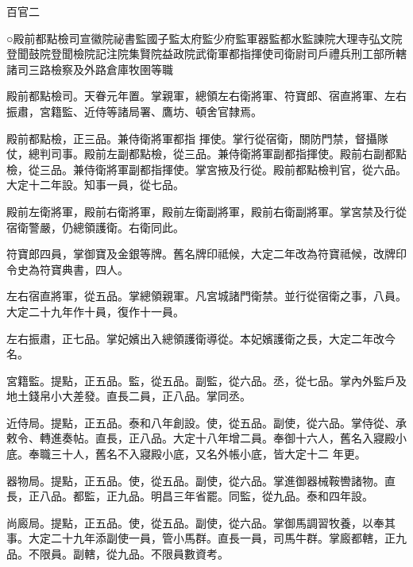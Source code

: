 
\begin{pinyinscope}

 百官二



 ○殿前都點檢司宣徽院祕書監國子監太府監少府監軍器監都水監諫院大理寺弘文院登聞鼓院登聞檢院記注院集賢院益政院武衛軍都指揮使司衛尉司戶禮兵刑工部所轄諸司三路檢察及外路倉庫牧圉等職



 殿前都點檢司。天眷元年置。掌親軍，總領左右衛將軍、符寶郎、宿直將軍、左右振肅，宮籍監、近侍等諸局署、鷹坊、頓舍官隸焉。



 殿前都點檢，正三品。兼侍衛將軍都指
 揮使。掌行從宿衛，關防門禁，督攝隊仗，總判司事。殿前左副都點檢，從三品。兼侍衛將軍副都指揮使。殿前右副都點檢，從三品。兼侍衛將軍副都指揮使。掌宮掖及行從。殿前都點檢判官，從六品。大定十二年設。知事一員，從七品。



 殿前左衛將軍，殿前右衛將軍，殿前左衛副將軍，殿前右衛副將軍。掌宮禁及行從宿衛警嚴，仍總領護衛。右衛同此。



 符寶郎四員，掌御寶及金銀等牌。舊名牌印祗候，大定二年改為符寶祗候，改牌印令史為符寶典書，四人。



 左右宿直將軍，從五品。掌總領親軍。凡宮城諸門衛禁。並行從宿衛之事，八員。大定二十九年作十員，復作十一員。



 左右振肅，正七品。掌妃嬪出入總領護衛導從。本妃嬪護衛之長，大定二年改今名。



 宮籍監。提點，正五品。監，從五品。副監，從六品。丞，從七品。掌內外監戶及地土錢帛小大差發。直長二員，正八品。掌同丞。



 近侍局。提點，正五品。泰和八年創設。使，從五品。副使，從六品。掌侍從、承敕令、轉進奏帖。直長，正八品。大定十八年增二員。奉御十六人，舊名入寢殿小底。奉職三十人，舊名不入寢殿小底，又名外帳小底，皆大定十二
 年更。



 器物局。提點，正五品。使，從五品。副使，從六品。掌進御器械鞍轡諸物。直長，正八品。都監，正九品。明昌三年省罷。同監，從九品。泰和四年設。



 尚廄局。提點，正五品。使，從五品。副使，從六品。掌御馬調習牧養，以奉其事。大定二十九年添副使一員，管小馬群。直長一員，司馬牛群。掌廄都轄，正九品。不限員。副轄，從九品。不限員數資考。




\end{pinyinscope}
